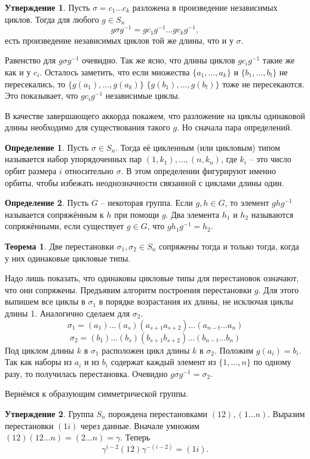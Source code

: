 \documentclass[10pt,a4paper,oneside]{book}
\theoremstyle{definition}
\newtheorem*{defn}{\color{yellow!30!red} Определение}
\newtheorem{thm}{\color{red!40!black}Теорема}
\newtheorem{utvr}{\color{blue!50!black}Утверждение}
\def\thrm{\begin{thm}}
\def\ethrm{\end{thm}}
\def\dfn{\begin{defn}}
\def\edfn{\end{defn}}
\def\utv{\begin{utvr}}
\def\eutv{\end{utvr}}
\begin{document}
\utv Пусть $\sigma=c_1\dots c_k$ разложена в произведение независимых циклов. Тогда для любого $g\in S_n$
$$g\sigma g^{-1}= gc_1 g^{-1}\dots gc_kg^{-1},$$
есть произведение независимых циклов той же длины, что и у $\sigma$.
\eutv
\proof Равенство для $g\sigma g^{-1}$ очевидно. Так же ясно, что длины циклов $gc_i g^{-1}$ такие же как и у $c_i$. Осталось заметить, что если множества $\{a_1,\dots,a_k\}$ и $\{b_1,\dots,b_l\}$ не пересекались, то $\{g(a_1),\dots,g(a_k)\}$ $\{g(b_1),\dots,g(b_l)\}$ тоже не пересекаются. Это показывает, что $gc_i g^{-1}$ независимые циклы.
\endproof

В качестве завершающего аккорда покажем, что разложение на циклы одинаковой длины необходимо для существования такого $g$. Но сначала пара определений.
\dfn Пусть $\sigma \in S_n$. Тогда её цикленным (или цикловым) типом называется набор упорядоченных пар $(1,k_1),\dots, (n,k_n)$, где $k_i$ -- это число орбит размера $i$ относительно $\sigma$. В этом определении фигурируют именно орбиты, чтобы избежать неоднозначности связанной с циклами длины один.
\edfn

\dfn Пусть $G$ -- некоторая группа. Если $g,h\in G$, то элемент $ghg^{-1}$ называется сопряжённым к $h$ при помощи $g$. Два элемента $h_1$ и $h_2$ называются сопряжёнными, если существует $g \in G$, что $gh_1g^{-1}=h_2$.
\edfn 

\thrm Две перестановки $\sigma_1,\sigma_2\in S_n$ сопряжены тогда и только тогда, когда у них одинаковые цикловые типы.
\ethrm
\proof Надо лишь показать, что одинаковы цикловые типы для перестановок означают, что они сопряжены. Предъявим алгоритм построения перестановки $g$. Для этого выпишем все циклы в $\sigma_1$ в порядке возрастания их длины, не исключая циклы длины 1. Аналогично сделаем для $\sigma_2$. 
$$\sigma_1=(a_1)\dots(a_s)(a_{s+1}a_{s+2})\dots (a_{n-t}\dots a_n)$$
$$\sigma_2=(b_1)\dots(b_s)(b_{s+1}b_{s+2})\dots (b_{n-t}\dots b_n)$$
Под циклом длины $k$ в $\sigma_1$ расположен цикл длины $k$ в $\sigma_2$. Положим $g(a_i)=b_i$. Так как наборы из $a_i$ и из $b_i$ содержат каждый элемент из $\{1,\dots,n\}$ по одному разу, то получилась перестановка. Очевидно $g\sigma g^{-1}=\sigma_2$.
\endproof

Вернёмся к образующим симметрической группы.

\utv Группа $S_n$ порождена перестановками $(12), (1 \dots n)$. 
\proof Выразим перестановки $(1i)$ через данные. Вначале умножим $(12)(12\dots n)=(2\dots n)=\gamma$. Теперь
$$\gamma^{i-2}(12)\gamma^{-(i-2)}=(1i).$$
\endproof
\eutv
\end{document}
